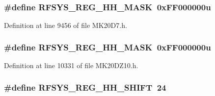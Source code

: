 \subsubsection[{\texorpdfstring{R\+F\+S\+Y\+S\+\_\+\+R\+E\+G\+\_\+\+H\+H\+\_\+\+M\+A\+SK}{RFSYS_REG_HH_MASK}}]{\setlength{\rightskip}{0pt plus 5cm}\#define R\+F\+S\+Y\+S\+\_\+\+R\+E\+G\+\_\+\+H\+H\+\_\+\+M\+A\+SK~0x\+F\+F000000u}\hypertarget{group___r_f_s_y_s___register___masks_gae1fb55483b3d79a2e74d0c1ad4e57d51}{}\label{group___r_f_s_y_s___register___masks_gae1fb55483b3d79a2e74d0c1ad4e57d51}


Definition at line 9456 of file M\+K20\+D7.\+h.

\subsubsection[{\texorpdfstring{R\+F\+S\+Y\+S\+\_\+\+R\+E\+G\+\_\+\+H\+H\+\_\+\+M\+A\+SK}{RFSYS_REG_HH_MASK}}]{\setlength{\rightskip}{0pt plus 5cm}\#define R\+F\+S\+Y\+S\+\_\+\+R\+E\+G\+\_\+\+H\+H\+\_\+\+M\+A\+SK~0x\+F\+F000000u}\hypertarget{group___r_f_s_y_s___register___masks_gae1fb55483b3d79a2e74d0c1ad4e57d51}{}\label{group___r_f_s_y_s___register___masks_gae1fb55483b3d79a2e74d0c1ad4e57d51}


Definition at line 10331 of file M\+K20\+D\+Z10.\+h.

\subsubsection[{\texorpdfstring{R\+F\+S\+Y\+S\+\_\+\+R\+E\+G\+\_\+\+H\+H\+\_\+\+S\+H\+I\+FT}{RFSYS_REG_HH_SHIFT}}]{\setlength{\rightskip}{0pt plus 5cm}\#define R\+F\+S\+Y\+S\+\_\+\+R\+E\+G\+\_\+\+H\+H\+\_\+\+S\+H\+I\+FT~24}\hypertarget{group___r_f_s_y_s___register___masks_gae78b067bd28db1d0ff57015f300312fb}{}\label{group___r_f_s_y_s___register___masks_gae78b067bd28db1d0ff57015f300312fb}


